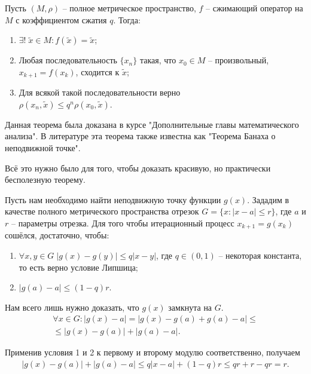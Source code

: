 \documentclass[../main.tex]{subfile}
\begin{document}
\begin{theorem}
	Пусть $(M,\rho)$ -- полное метрическое пространство, $f$ -- сжимающий
	оператор на $M$ с коэффициентом сжатия $q$. Тогда:
	\begin{enumerate}
		\item $\exists!\;\widetilde{x}\in M: f(\widetilde{x})=\widetilde{x}$;
		\item Любая последовательность $\{x_n\}$ такая, что $x_0 \in M$ --
			произвольный, $x_{k+1}=f(x_k)$, сходится к $\widetilde{x}$;
		\item Для всякой такой последовательности верно\\
			$\rho(x_n, \widetilde{x}) \le q ^ n \rho(x_0, \widetilde{x})$.
	\end{enumerate}
\end{theorem}

Данная теорема была доказана в курсе "Дополнительные главы математического анализа"{}.
В литературе эта теорема также известна как "Теорема Банаха о неподвижной точке"{}.

Всё это нужно было для того, чтобы доказать красивую, но практически бесполезную
теорему.

\begin{theorem}
	Пусть нам необходимо найти неподвижную точку функции $g(x)$. Зададим
	в качестве полного метрического пространства отрезок $G=\{x: |x-a| \le r\}$,
	где $a$ и $r$ -- параметры отрезка. Для того чтобы итерационный процесс
	$x_{k+1}=g(x_k)$ сошёлся, достаточно, чтобы:
	\begin{enumerate}
		\item $\forall x,y\in G\;|g(x)-g(y)|\le q|x-y|$, где $q\in(0,1)$ --
			некоторая константа, то есть верно условие Липшица;
		\item $|g(a)-a|\le(1-q)r$.
	\end{enumerate}
\end{theorem}

\beginproof

	Нам всего лишь нужно доказать, что $g(x)$ замкнута на $G$.
	\begin{multline*}
		\forall x\in G:|g(x)-a|=|g(x)-g(a)+g(a)-a|\le \\
		\le|g(x)-g(a)|+|g(a)-a|.
	\end{multline*}

	Применив условия 1 и 2 к первому и второму модулю соответственно, получаем
	\begin{align*}
		|g(x)-g(a)|+|g(a)-a|\le q|x-a|+(1-q)r\le qr+r-qr=r.
	\end{align*}
\end{document}

